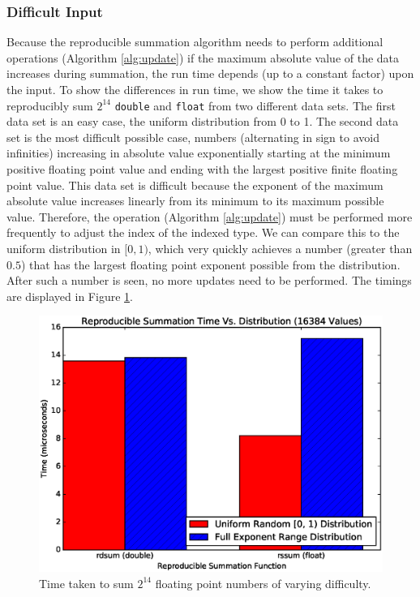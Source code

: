   \subsubsection{Difficult Input}
    Because the reproducible summation algorithm needs to perform additional
    operations (Algorithm \ref{alg:update}) if the maximum absolute value
    of the data increases during summation, the run time depends (up to a
    constant factor) upon the input. To show the differences in run time,
    we show the time it takes to reproducibly sum $2^{14}$ \texttt{double}
    and \texttt{float} from two different data sets. The first data set is
    an easy case, the uniform distribution from 0 to 1. The second data set
    is the most difficult possible case, numbers (alternating in sign to
    avoid infinities) increasing in absolute value exponentially starting
    at the minimum positive floating point value and ending with the
    largest positive finite floating point value. This data set is difficult
    because the exponent of the maximum absolute value increases linearly
    from its minimum to its maximum possible value. Therefore, the
     operation (Algorithm \ref{alg:update}) must be
    performed more frequently to adjust the index of the indexed type. We
    can compare this to the uniform distribution in $[0, 1)$, which very
    quickly achieves a number (greater than $0.5$) that has the largest
    floating point exponent possible from the distribution. After such a
    number is seen, no more updates need to be performed. The timings are
    displayed in Figure \ref{fig:easy_vs_hard_timings}.
  \begin{figure}[H]
  \begin{center}
  \includegraphics[width=\textwidth]{plots/easy_vs_hard}
  \caption{Time taken to sum $2^{14}$ floating point numbers of varying difficulty.}
  \label{fig:easy_vs_hard_timings}
  \end{center}
  \end{figure}
